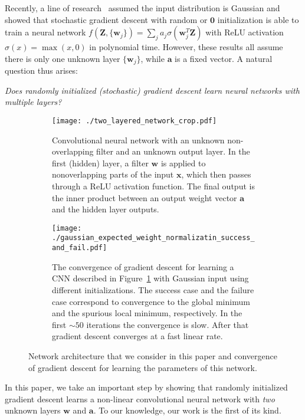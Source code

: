 \documentclass{article}
\newcommand{\firstlayer}{w}
\newcommand{\secondlayer}{a}
\def\vw{\mathbf{w}}
\def\va{\mathbf{a}}
\def\vZ{\mathbf{Z}}
\newcommand{\mat}[1]{\mathbf{#1}}
\newcommand{\vect}[1]{\mathbf{#1}}
\begin{document}
Recently, a line of research~\citep{tian2017analytical,brutzkus2017globally,li2017convergence,soltanolkotabi2017learning,shalev2017weight} assumed the input distribution is Gaussian and showed that stochastic gradient descent with random or $\vect{0}$ initialization is able to train a neural network $f(\mat{Z}, \{\vw_j\}) = \sum_j a_j\sigma(\vw_j^T\vZ)$ with ReLU activation $\sigma(x) = \max(x, 0)$ in polynomial time.
However, these results all assume there is only one unknown layer $\{\vw_j\}$, while $\va$ is a fixed vector. A natural question thus arises:
\begin{center}
\emph{Does randomly initialized (stochastic) gradient descent learn  neural networks with multiple layers?}
\end{center}\begin{figure*}
	\centering
	\begin{subfigure}[t]{0.45\textwidth}
		\texttt{[image: ./two\_layered\_network\_crop.pdf]}
		\caption{Convolutional neural network with an unknown non-overlapping filter and an unknown output layer.
	In the first (hidden) layer, a filter $\vect{\firstlayer}$ is applied to nonoverlapping parts of the input $\vect{x}$, which then passes through a ReLU activation function.
	The final output is the inner product between an output weight vector $\vect{\secondlayer}$ and the hidden layer outputs.
	}\label{fig:architecture}
	\end{subfigure}
	\qquad
	\begin{subfigure}[t]{0.45\textwidth}
	\texttt{[image: ./gaussian\_expected\_weight\_normalizatin\_success\_and\_fail.pdf]}
		\caption{The convergence of gradient descent for learning a CNN described in Figure~\ref{fig:architecture} with Gaussian input using different initializations.
The success case and the failure case correspond to convergence to the global minimum and the spurious local minimum, respectively.
In the first $\sim 50$ iterations the convergence is slow.
After that gradient descent converges at a fast linear rate.
			}\label{fig:gd_convergence}
	\end{subfigure}
	\caption{Network architecture that we consider in this paper and convergence of gradient descent for learning the parameters of this network.
}
    \label{fig:architecture_and_convergence}
\end{figure*}

In this paper, we take an important step by showing that randomly initialized gradient descent learns a non-linear convolutional neural network with \emph{two} unknown layers $\vw$ and $\va$.
To our knowledge, our work is the first of its kind.
\end{document}
